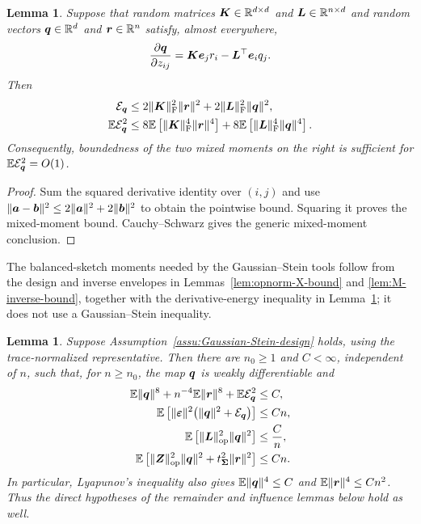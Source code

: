 \documentclass{article}
\theoremstyle{plain} %
\newtheorem{lemma}[theorem]{Lemma}
\theoremstyle{definition} %
\theoremstyle{definition} %
\begin{document}
\begin{lemma}
\label{lem:derivative-energy-from-inverse-moments}
Suppose that random matrices $\boldsymbol{K}\in{\mathbb{R}}^{d\times d}$ and
$\boldsymbol{L}\in{\mathbb{R}}^{n\times d}$ and random vectors $\boldsymbol{q}\in{\mathbb{R}}^d$ and
$\boldsymbol{r}\in{\mathbb{R}}^n$ satisfy, almost everywhere,
\begin{align*}
    \pdv{\boldsymbol{q}}{z_{ij}}
       =\boldsymbol{K}\boldsymbol{e}_jr_i-\boldsymbol{L}^\top\boldsymbol{e}_iq_j.
\end{align*}
Then
\begin{align*}
    {\mathcal E}_{\boldsymbol{q}}
    &\leq2\lVert\boldsymbol{K}\rVert_{\rm F}^2\lVert\boldsymbol{r}\rVert^2
       +2\lVert\boldsymbol{L}\rVert_{\rm F}^2\lVert\boldsymbol{q}\rVert^2,\\
    {\mathbb{E}}{\mathcal E}_{\boldsymbol{q}}^2
    &\leq8{\mathbb{E}}\left[\lVert\boldsymbol{K}\rVert_{\rm F}^4\lVert\boldsymbol{r}\rVert^4\right]
       +8{\mathbb{E}}\left[\lVert\boldsymbol{L}\rVert_{\rm F}^4\lVert\boldsymbol{q}\rVert^4\right].
\end{align*}
Consequently, boundedness of the two mixed moments on the right is sufficient
for ${\mathbb{E}}{\mathcal E}_{\boldsymbol{q}}^2=O(1)$.
\end{lemma}

\begin{proof}
Sum the squared derivative identity over $(i,j)$ and use
$\lVert\boldsymbol{a}-\boldsymbol{b}\rVert^2\leq2\lVert\boldsymbol{a}\rVert^2+2\lVert\boldsymbol{b}\rVert^2$ to obtain the pointwise
bound.  Squaring it proves the mixed-moment bound.  Cauchy--Schwarz gives the
generic mixed-moment conclusion.
\end{proof}

The balanced-sketch moments needed by the Gaussian--Stein tools follow
from the design and inverse
envelopes in Lemmas~\ref{lem:opnorm-X-bound} and
\ref{lem:M-inverse-bound}, together with the derivative-energy inequality in
Lemma~\ref{lem:derivative-energy-from-inverse-moments}; it does not use a
Gaussian--Stein inequality.

\begin{lemma}
\label{lem:balanced-Stein-sufficient-conditions}
Suppose Assumption~\ref{assu:Gaussian-Stein-design} holds, using the
trace-normalized
representative.  Then there are $n_0\geq1$ and $C<\infty$,
independent of $n$, such that, for $n\geq n_0$, the map $\boldsymbol{q}$ is weakly
differentiable and
\begin{align}
    {\mathbb{E}}\lVert\boldsymbol{q}\rVert^{8}
       +n^{-4}{\mathbb{E}}\lVert\boldsymbol{r}\rVert^{8}
       +{\mathbb{E}}{\mathcal E}_{\boldsymbol{q}}^{2}
    &\leq C,\notag\\
    {\mathbb{E}}\left[
       \lVert{\boldsymbol{\varepsilon} }\rVert^{2}
       \bigl(\lVert\boldsymbol{q}\rVert^{2}+{\mathcal E}_{\boldsymbol{q}}\bigr)
    \right]
    &\leq Cn,\notag\\
    {\mathbb{E}}\left[
       \lVert\boldsymbol{L}\rVert_{\rm op}^{2}\lVert\boldsymbol{q}\rVert^{2}
    \right]
    &\leq \frac{C}{n},\notag\\
    {\mathbb{E}}\left[
       \lVert\boldsymbol{Z}\rVert_{\rm op}^{2}\lVert\boldsymbol{q}\rVert^{2}
       +t_{\boldsymbol{\Sigma}}^{2}\lVert\boldsymbol{r}\rVert^{2}
    \right]
    &\leq Cn.
    \label{eq:balanced-Stein-sufficient-conditions}
\end{align}
In particular, Lyapunov's inequality also gives
${\mathbb{E}}\lVert\boldsymbol{q}\rVert^{4}\leq C$ and
${\mathbb{E}}\lVert\boldsymbol{r}\rVert^{4}\leq Cn^2$.  Thus the direct hypotheses of the remainder
and influence lemmas below hold as well.
\end{lemma}
\end{document}
